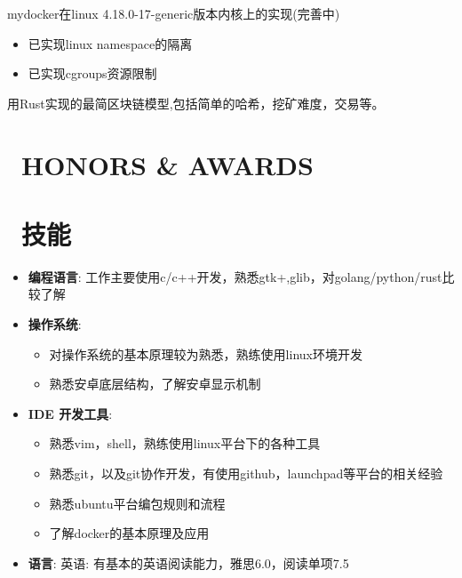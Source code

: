 \documentclass{resume}
\begin{document}
mydocker在linux 4.18.0-17-generic版本内核上的实现(完善中)
\begin{itemize}
  \item 已实现linux namespace的隔离
  \item 已实现cgroups资源限制
\end{itemize}

用Rust实现的最简区块链模型,包括简单的哈希，挖矿难度，交易等。

\section{\faHeartO\ HONORS & AWARDS}

\section{\faCogs\ 技能}
\begin{itemize}[parsep=0.25ex]
  \item \textbf{编程语言}:
    工作主要使用c/c++开发，熟悉gtk+,glib，对golang/python/rust比较了解

  \item \textbf{操作系统}:
    \begin{itemize}
      \item  对操作系统的基本原理较为熟悉，熟练使用linux环境开发
      \item  熟悉安卓底层结构，了解安卓显示机制
    \end{itemize}

  \item \textbf{IDE 开发工具}:
    \begin{itemize}
      \item 熟悉vim，shell，熟练使用linux平台下的各种工具
      \item 熟悉git，以及git协作开发，有使用github，launchpad等平台的相关经验
      \item 熟悉ubuntu平台编包规则和流程
      \item 了解docker的基本原理及应用
    \end{itemize}

  \item \textbf{语言}:
     英语: 有基本的英语阅读能力，雅思6.0，阅读单项7.5

\end{itemize}
\end{document}
